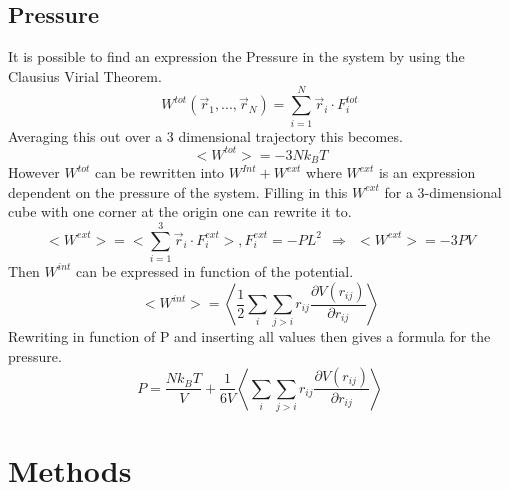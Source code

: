 \documentclass[a4paper,12pt]{article} %
\begin{document}
\subsection{Pressure}
It is possible to find an expression the Pressure in the system by using the Clausius Virial Theorem.\cite{verlet1967}\cite{Lion_2012}
\begin{equation}
    W^{tot}(\Vec{r}_1,...,\Vec{r}_N) = \sum_{i=1}^{N} \Vec{r}_i\cdot F^{tot}_i  
\end{equation}
Averaging this out over a 3 dimensional trajectory this becomes.
\begin{equation}
    < W^{tot}> = -3Nk_BT
\end{equation}
However $W^{tot}$ can be rewritten into $W^{Int} + W^{ext}$ where $W^{ext}$ is an expression dependent on the pressure of the system. Filling in this $W^{ext}$ for a 3-dimensional cube with one corner at the origin one can rewrite it to.
\begin{equation}
    <W^{ext}> =  <\sum_{i=1}^{3} \Vec{r}_i\cdot F^{ext}_i>, F^{ext}_i = -PL^2 \ \ \Rightarrow \ \ <W^{ext}> = -3PV
\end{equation}
Then $W^{int}$ can be expressed in function of the potential.
\begin{equation}
    <W^{int}> = \left<\frac{1}{2}\sum_i \sum_{j>i} r_{ij}\frac{\partial V(r_{ij})}{\partial r_{ij}}\right>
\end{equation}
Rewriting in function of P and inserting all values then gives a formula for the pressure.
\begin{equation}\label{Pressure}
    P = \frac{Nk_BT}{V} + \frac{1}{6V}\left< \sum_{i}\sum_{j>i} r_{ij}\frac{\partial V(r_{ij})}{\partial r_{ij}}\right>
\end{equation}
\newpage
\section{Methods}
\label{Methods}
\end{document}

